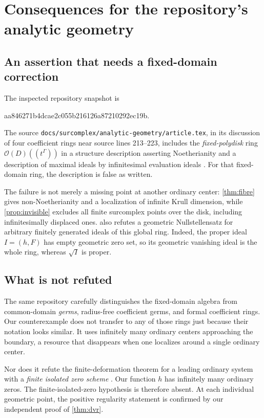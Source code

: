 \documentclass[11pt,letterpaper]{article}
\numberwithin{equation}{section}
\theoremstyle{definition}
\theoremstyle{remark}
\newcommand{\OO}{\mathcal O}
\begin{document}
\section{Consequences for the repository's analytic geometry}
\label{sec:repository}

\subsection{An assertion that needs a fixed-domain correction}
The inspected repository snapshot is
\begin{center}\small\ttfamily
 aa846271b4dcae2c055b216126a87210292ec19b.
\end{center}
The source \texttt{docs/surcomplex/analytic-geometry/article.tex},
in its discussion of four coefficient rings near source lines
213--223, includes the \emph{fixed-polydisk} ring
$\OO(D)((t^\Gamma))$ in a structure description asserting
Noetherianity and a description of maximal ideals by infinitesimal
evaluation ideals \cite{RepoGeometry}. For that fixed-domain ring,
the description is false as written.

The failure is not merely a missing point at another ordinary center:
\cref{thm:fibre} gives non-Noetherianity and a localization of infinite
Krull dimension, while \cref{prop:invisible} excludes all finite
surcomplex points over the disk, including infinitesimally displaced
ones.  also refutes a geometric
Nullstellensatz for arbitrary finitely generated ideals of this global
ring. Indeed, the proper ideal $I=(h,F)$ has empty geometric zero set,
so its geometric vanishing ideal is the whole ring, whereas
$\sqrt I$ is proper.

\subsection{What is not refuted}
The same repository carefully distinguishes the fixed-domain algebra
from common-domain \emph{germs}, radius-free coefficient germs, and
formal coefficient rings. Our counterexample does not transfer to any
of those rings just because their notation looks similar. It uses
infinitely many ordinary centers approaching the boundary, a resource
that disappears when one localizes around a single ordinary center.

Nor does it refute the finite-deformation theorem for a leading ordinary
system with a \emph{finite isolated zero scheme}
\cite{RepoFinite}. Our function $h$ has infinitely many ordinary zeros.
The finite-isolated-zero hypothesis is therefore absent. At each
individual geometric point, the positive regularity statement is
confirmed by our independent proof of \cref{thm:dvr}.
\end{document}
